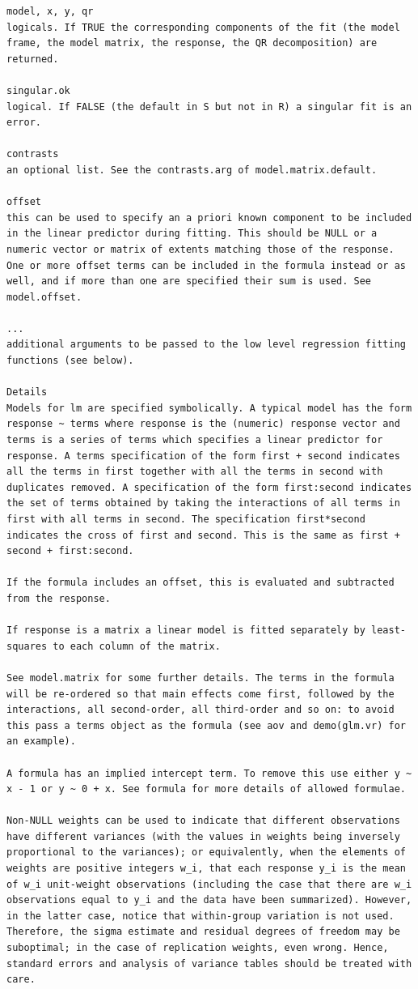 \documentclass[
]{article}
\begin{document}
\begin{verbatim}
model, x, y, qr 
logicals. If TRUE the corresponding components of the fit (the model frame, the model matrix, the response, the QR decomposition) are returned.

singular.ok 
logical. If FALSE (the default in S but not in R) a singular fit is an error.

contrasts   
an optional list. See the contrasts.arg of model.matrix.default.

offset  
this can be used to specify an a priori known component to be included in the linear predictor during fitting. This should be NULL or a numeric vector or matrix of extents matching those of the response. One or more offset terms can be included in the formula instead or as well, and if more than one are specified their sum is used. See model.offset.

... 
additional arguments to be passed to the low level regression fitting functions (see below).

Details
Models for lm are specified symbolically. A typical model has the form response ~ terms where response is the (numeric) response vector and terms is a series of terms which specifies a linear predictor for response. A terms specification of the form first + second indicates all the terms in first together with all the terms in second with duplicates removed. A specification of the form first:second indicates the set of terms obtained by taking the interactions of all terms in first with all terms in second. The specification first*second indicates the cross of first and second. This is the same as first + second + first:second.

If the formula includes an offset, this is evaluated and subtracted from the response.

If response is a matrix a linear model is fitted separately by least-squares to each column of the matrix.

See model.matrix for some further details. The terms in the formula will be re-ordered so that main effects come first, followed by the interactions, all second-order, all third-order and so on: to avoid this pass a terms object as the formula (see aov and demo(glm.vr) for an example).

A formula has an implied intercept term. To remove this use either y ~ x - 1 or y ~ 0 + x. See formula for more details of allowed formulae.

Non-NULL weights can be used to indicate that different observations have different variances (with the values in weights being inversely proportional to the variances); or equivalently, when the elements of weights are positive integers w_i, that each response y_i is the mean of w_i unit-weight observations (including the case that there are w_i observations equal to y_i and the data have been summarized). However, in the latter case, notice that within-group variation is not used. Therefore, the sigma estimate and residual degrees of freedom may be suboptimal; in the case of replication weights, even wrong. Hence, standard errors and analysis of variance tables should be treated with care.


\end{verbatim}
\end{document}

